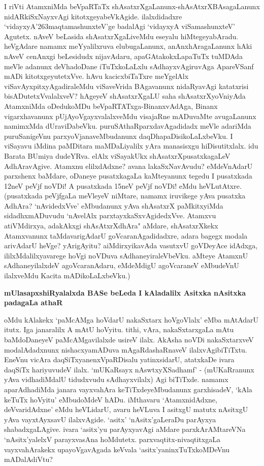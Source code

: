 \noindent
I riVti AtamxniMda beVpaRTaTx shAsatxrXgaLanunx-shAsAtxrXBAsagaLanunx nidARkiSxNayxvAgi kitotxgeyabeVkAgide. ilalxdidadxre `vidayxyA\char'263maqtamashunxteV'ge badalAgi `vidayxyA viSamashunxteV' Agutetx. nAveV beLasida shAsatxrXgaLiveMdu eseyalu hiMtegeyabAradu. heVgAdare namamx meYyalilxruva elubugaLanunx, anAnxhAragaLanunx hAki nAveV cenAnxgi beLesidudx nijavAdaru, apaGAtakokxLapaTuTx tuMDAda meVle adanunx deVhadoDane iTuTxkoLaLxlu sAdhayxvAgiruvAga ApareVSanf mADi kitotxgeyutetxVve. hAvu kacicxbiTaTxre meYgelAlx viSavAyxpitxyAgadiraleMdu viSaveVrida BAgavanunx nidaRyavAgi katatxrisi bisADutetxVvalalxveV? hAgeyeV shAsatxrXgaLU saha shAsatxrXyoVniyAda AtamxniMda oDedukoMDu beVpaRTATxga-BinanxvAdAga, Binanx vigarxhavanunx pUjAyoVgayxvalalxveMdu visajaRne mADuvaMte avugaLanunx namimxMda dUraviDabeVku. puruSAthaRparxdavAgadidadx meVle adariMda puruSanigeVnu parxyoVjanaveMbudanunx daqDhapaDisikoLaLxbeVku. I viSayavu iMdina paMDitara maMDaLiyalilx yAra manasisxgu hiDisutitxlalx. idu Barata BUmiya dudeYRva. elAlx viSayakUkx shAsatxrXpusatxkagaLeV AdhAravAgive. Atamxnu elilxdAdxne? avana lakaSxNavAvudu? eMdeVnAdarU parxshenx baMdare, oDaneye pusatxkagaLa kaMteyanunx tegedu I pusatxkada 12neV peVjf noVDi! A pusatxkada 15neV peVjf noVDi! eMdu heVLutAtxre. (pusatxkada peVjfgaLa meVleyeV niMtare, namamx iruvikege yAva pusatxka AdhAra? `nAvidedxVve' eMbudanunx yAva shAsatxrX paMkitxyiMda sidadhxmADuvudu `nAvelAlx parxtayxkaSxvAgidedxVve. Atamxvu atiVMdirxya, adakAkxgi shAsAtxrXdhAra" aMdare, shAsatxrXkekx Atamxvanunx taMdavarigAdarU goVcaranAgadidadxre, adara bagegx modala arivAdarU heVge? yArigAyitu? aiMdirxyikavAda vasutxvU goVDeyAce idAdxga, ililxMdalilxyavarege hoVgi noVDuva sAdhaneyiraleVbeVku. aMteye AtamxnU sAdhaneyilalxdeV agoVcaranAdaru, eMdeMdigU agoVcaraneV eMbudeVnU ilalxveMdu Kacita mADikoLaLxbeVku.)

{\bigskip
\noindent
{\large\bf mUlasapxshiRyalalxda BASe beLeda I kAladalilx Asitxka nAsitxka padagaLa athaR}}\label{page189}
\medskip

\noindent
oMdu kAlakekx `paMcAMga hoVdarU nakaSxtarx hoVgoVlalx' eMba mAtAdarU itutx. Iga janaralilx A mAtU hoVyitu. tithi, vAra, nakaSxtarxgaLa mAtu baMdoDaneyeV paMcAMgavilalxde usireV ilalx. AkAsha noVDi nakaSxtarxveV modalAdadxnunx nishacxyamADuva mAgaRdashaRnaveV ilalxvAgibiTiTxtu. EneVnu vicAra daqSiTxyanenxVpaRDisalu yatinxsidarU, atatxkaDe ivara daqSiTx hariyuvudeV ilalx. `mUKaRsayx nAswtxyXSadhamf'\label{189} - (mUKaRranunx yAva vidhadiMdalU tidudxvudu sAdhayxvilalx) Agi biTiTxde. namamx aparAdhadiMda janara vayxvahAra keTiTxdeyeMbudanunx garxhisadeV, `kAla keTuTx hoVyitu' eMbudoMdeV hADu. iMthavaru `AtamxnidAdxne, deVvaridAdxne' eMdu heVLidarU, avaru heVLuva I asitxgU matutx nAsitxgU yAva vayxtAyxsavU ilalxvAgide. `asitx' `nAsitx'gaLeraDu parAyxya shabadxgaLAgive. ivara `asitx'yu parAyxyavAgi aMdare parxkArAMtareVNa `nAsitx'yalelxV parayxvasAna hoMdutetx. parxvaqtitx-nivaqtitxgaLa vayxvahArakekx upayoVgavAgada keVvala `asitx'yaninxTuTxkoMDeVnu mADalAdiVtu? 

